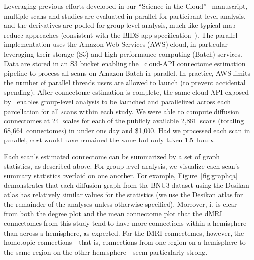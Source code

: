 \documentclass[11pt]{article}
\begin{document}

Leveraging previous efforts developed in our  ``Science in the Cloud''~\cite{sic} manuscript, multiple scans and studies are evaluated in parallel for participant-level analysis, and the derivatives are pooled for group-level analysis, much like typical map-reduce approaches (consistent with the BIDS app specification~\cite{bidsapps}). The parallel  implementation uses the Amazon Web Services (AWS) cloud, in particular leveraging their storage (S3) and high performance computing (Batch) services. Data are stored in an S3 bucket enabling  the \ndmg~cloud-API connectome estimation pipeline to process all scans on Amazon Batch in parallel. In practice,  AWS limits the number of parallel threads users are allowed to launch (to prevent accidental spending). After connectome estimation is complete, the same cloud-API exposed by \ndmg~enables group-level analysis to be launched and parallelized across each parcellation for all scans within each study. We were able to compute diffusion connectomes at 24~scales for each of the publicly available 2,861~scans (totaling 68,664~connectomes) in under one day and \$1,000. Had we processed each scan in parallel, cost would have remained the same but only taken $1.5$~hours.


Each scan's estimated connectome can be summarized by a set of graph statistics, as described above. For group-level analysis, we visualize each scan's summary statistics overlaid on one another. For example, Figure~\ref{fig:graphqa} demonstrates that each diffusion graph from the BNU3 dataset using the Desikan atlas has relatively similar values for the statistics (we use the Desikan atlas for the remainder of the analyses unless otherwise specified). Moreover, it is clear from both the degree plot and the mean connectome plot that the dMRI connectomes from this study tend to have more connections within a hemisphere than across a hemisphere, as expected. For the fMRI connectomes, however, the homotopic connections---that is, connections from one region on a hemisphere to the same region on the other hemisphere---seem particularly strong.
 
\end{document}
